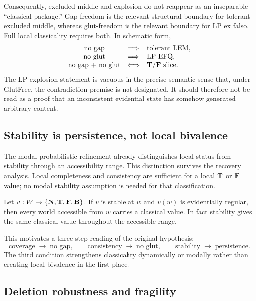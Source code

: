 Consequently, excluded middle and explosion do not reappear as an inseparable
``classical package.''  Gap-freedom is the relevant structural boundary for tolerant
excluded middle, whereas glut-freedom is the relevant boundary for LP ex falso.
Full local classicality requires both.  In schematic form,
\[
\begin{array}{ccl}
  \text{no gap} &\Longrightarrow& \text{tolerant LEM},\\
  \text{no glut} &\Longrightarrow& \text{LP EFQ},\\
  \text{no gap + no glut} &\Longleftrightarrow& \mathbf{T}/\mathbf{F}\text{ slice}.
\end{array}
\]
The LP-explosion statement is vacuous in the precise semantic sense that, under
GlutFree, the contradiction premise is not designated.  It should therefore not be
read as a proof that an inconsistent evidential state has somehow generated arbitrary
content.

\subsection{Stability is persistence, not local bivalence}

The modal-probabilistic refinement already distinguishes local status from stability
through an accessibility range.  This distinction survives the recovery analysis.
Local completeness and consistency are sufficient for a local \(\mathbf{T}\) or \(\mathbf{F}\)
value; no modal stability assumption is needed for that classification.

\begin{proposition}
\label{prop:stable-classical-recovery}
Let \(v:W\to\{\mathbf{N},\mathbf{T},\mathbf{F},\mathbf{B}\}\).  If \(v\) is stable at \(w\) and
\(v(w)\) is evidentially regular, then every world accessible from \(w\) carries a
classical value.  In fact stability gives the same classical value throughout the
accessible range.
\statusverified
\end{proposition}

This motivates a three-step reading of the original hypothesis:
\[
  \boxed{
  \text{coverage}\;\to\;\text{no gap},\qquad
  \text{consistency}\;\to\;\text{no glut},\qquad
  \text{stability}\;\to\;\text{persistence}.}
\]
The third condition strengthens classicality dynamically or modally rather than
creating local bivalence in the first place.

\subsection{Deletion robustness and fragility}

